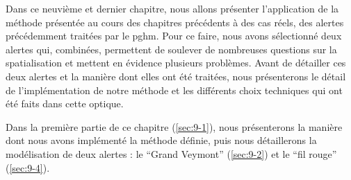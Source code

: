 Dans ce neuvième et dernier chapitre, nous allons présenter
l'application de la méthode présentée au cours des chapitres
précédents à des cas réels, des alertes précédemment traitées par le
\ac{pghm}. Pour ce faire, nous avons sélectionné deux alertes qui,
combinées, permettent de soulever de nombreuses questions sur la
spatialisation et mettent en évidence plusieurs problèmes. Avant de
détailler ces deux alertes et la manière dont elles ont été traitées,
nous présenterons le détail de l'implémentation de notre méthode et
les différents choix techniques qui ont été faits dans cette optique.

Dans la première partie de ce chapitre (\autoref{sec:9-1}), nous
présenterons la manière dont nous avons implémenté la méthode définie,
puis nous détaillerons la modélisation de deux alertes : le
\enquote{Grand Veymont} (\autoref{sec:9-2}) et le \enquote{fil rouge}
(\autoref{sec:9-4}).

